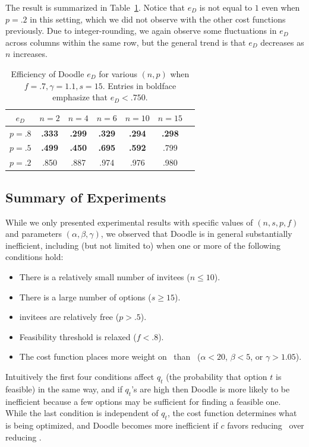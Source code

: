 The result is summarized in Table~\ref{bdoodle:table:DoodleEfficiency-lower-attendance_inconvenience_averse}. Notice that $e_{D}$ is not equal to $1$ even when $p = .2$ in this setting, which we did not observe with the other cost functions previously. Due to integer-rounding, we again observe some fluctuations in $e_{D}$ across columns within the same row, but the general trend is that $e_{D}$ decreases as $n$ increases.
\begin{table}[h]  %
\centering
\begin{tabular}{|c|c|c|c|c|c|c|}
	\hline
	$e_{D}$ & $n = 2$ & $n = 4$ & $n = 6$ & $ n = 10 $ & $n = 15$ \\ \hline
	$p = .8$ & \textbf{.333} & \textbf{.299} & \textbf{.329} & \textbf{.294} & \textbf{.298} \\ \hline
	$p = .5$ & \textbf{.499} & \textbf{.450} & \textbf{.695} & \textbf{.592} & .799  \\ \hline
	$p = .2$ & .850 & .887 & .974 & .976 & .980 \\ \hline
\end{tabular}
\caption{Efficiency of Doodle $e_{D}$ for various $(n, p)$ when $f = .7, \gamma=1.1, s = 15$.
Entries in boldface emphasize that $e_{D} < .750$.
} \label{bdoodle:table:DoodleEfficiency-lower-attendance_inconvenience_averse}
\end{table}


\subsection{Summary of Experiments}
While we only presented experimental results with specific values of $(n, s, p, f)$ and parameters $(\alpha, \beta, \gamma)$, we observed that Doodle is in general substantially inefficient, including (but not limited to) when one or more of the following conditions hold:
\begin{itemize}
	\item There is a relatively small number of invitees ($n \leq 10$).
	\item There is a large number of options ($s \geq 15$).
	\item invitees are relatively free ($p > .5$).
	\item Feasibility threshold is relaxed ($f < .8$).
	\item The cost function places more weight on \Inconvenience\ than \Time\ ($\alpha < 20$, $\beta < 5$, or $\gamma > 1.05$).
\end{itemize}
Intuitively the first four conditions affect $q_t$ (the probability that option $t$ is feasible) in the same way, and if $q_t$'s are high then Doodle is more likely to be inefficient because a few options may be sufficient for finding a feasible one. While the last condition is independent of $q_t$, the cost function determines what is being optimized, and Doodle becomes more inefficient if $c$ favors reducing \Inconvenience\ over reducing \Time.


